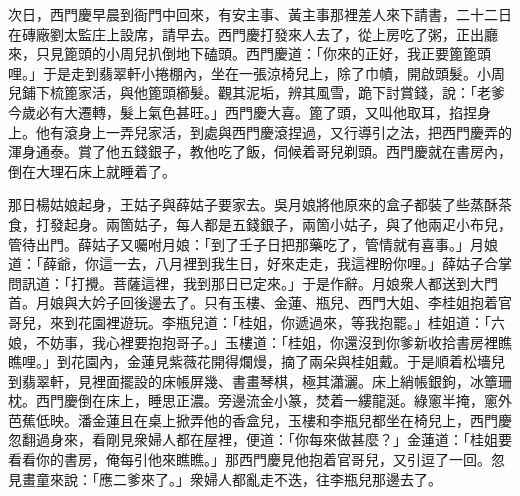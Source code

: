 次日，西門慶早晨到衙門中回來，有安主事、黃主事那裡差人來下請書，二十二日在磚廠劉太監庄上設席，請早去。西門慶打發來人去了，從上房吃了粥，正出廳來，只見篦頭的小周兒扒倒地下磕頭。西門慶道：「你來的正好，我正要篦篦頭哩。」于是走到翡翠軒小捲棚內，坐在一張涼椅兒上，除了巾幘，開啟頭髮。小周兒鋪下梳篦家活，與他篦頭櫛髮。觀其泥垢，辨其風雪，跪下討賞錢，說：「老爹今歲必有大遷轉，髮上氣色甚旺。」西門慶大喜。篦了頭，又叫他取耳，掐捏身上。他有滾身上一弄兒家活，到處與西門慶滾捏過，又行導引之法，把西門慶弄的渾身通泰。賞了他五錢銀子，教他吃了飯，伺候着哥兒剃頭。西門慶就在書房內，倒在大理石床上就睡着了。

那日楊姑娘起身，王姑子與薛姑子要家去。吳月娘將他原來的盒子都裝了些蒸酥茶食，打發起身。兩箇姑子，每人都是五錢銀子，兩箇小姑子，與了他兩疋小布兒，管待出門。薛姑子又囑咐月娘：「到了壬子日把那藥吃了，管情就有喜事。」月娘道：「薛爺，你這一去，八月裡到我生日，好來走走，我這裡盼你哩。」薛姑子合掌問訊道：「打攪。菩薩這裡，我到那日已定來。」于是作辭。月娘衆人都送到大門首。月娘與大妗子回後邊去了。只有玉樓、金蓮、瓶兒、西門大姐、李桂姐抱着官哥兒，來到花園裡遊玩。李瓶兒道：「桂姐，你遞過來，等我抱罷。」桂姐道：「六娘，不妨事，我心裡要抱抱哥子。」玉樓道：「桂姐，你還沒到你爹新收拾書房裡瞧瞧哩。」到花園內，金蓮見紫薇花開得爛熳，摘了兩朵與桂姐戴。{}于是順着松墻兒到翡翠軒，見裡面擺設的床帳屏幾、書畫琴棋，極其瀟灑。床上綃帳銀鉤，冰簟珊枕。西門慶倒在床上，睡思正濃。旁邊流金小篆，焚着一縷龍涎。綠窻半掩，窻外芭蕉低映。潘金蓮且在桌上掀弄他的香盒兒，玉樓和李瓶兒都坐在椅兒上，西門慶忽翻過身來，看剛見衆婦人都在屋裡，便道：「你每來做甚麼？」金蓮道：「桂姐要看看你的書房，俺每引他來瞧瞧。」那西門慶見他抱着官哥兒，又引逗了一回。忽見畫童來說：「應二爹來了。」衆婦人都亂走不迭，往李瓶兒那邊去了。

